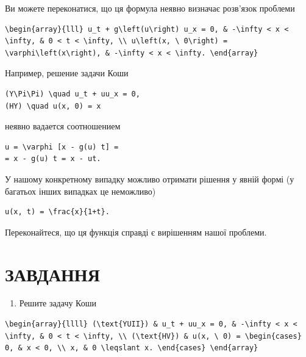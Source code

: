 \documentclass[
  ukrainian,
]{article}
\providecommand{\tightlist}{%
  \setlength{\itemsep}{0pt}\setlength{\parskip}{0pt}}
\begin{document}
Ви можете переконатися, що ця формула неявно визначає розв'язок проблеми

\begin{verbatim}
\begin{array}{lll} u_t + g\left(u\right) u_x = 0, & -\infty < x < \infty, & 0 < t < \infty, \\ u\left(x, \ 0\right) = \varphi\left(x\right), & -\infty < x < \infty. \end{array}
\end{verbatim}

Например, решение задачи Коши

\begin{verbatim}
(Y\Pi\Pi) \quad u_t + uu_x = 0,
(HY) \quad u(x, 0) = x
\end{verbatim}

неявно вадается соотношением

\begin{verbatim}
u = \varphi [x - g(u) t] =
= x - g(u) t = x - ut.
\end{verbatim}

У нашому конкретному випадку можливо отримати рішення у явній формі (у
багатьох інших випадках це неможливо)

\begin{verbatim}
u(x, t) = \frac{x}{1+t}.
\end{verbatim}

Переконайтеся, що ця функція справді є вирішенням нашої проблеми.

\section{\texorpdfstring{\textbf{ЗАВДАННЯ}}{ЗАВДАННЯ}}\label{ux437ux430ux432ux434ux430ux43dux43dux44f}

\begin{enumerate}
\def\labelenumi{\arabic{enumi}.}
\tightlist
\item
  Решите задачу Коши
\end{enumerate}

\begin{verbatim}
\begin{array}{llll} (\text{YUII}) & u_t + uu_x = 0, & -\infty < x < \infty, & 0 < t < \infty, \\ (\text{HV}) & u(x, \ 0) = \begin{cases} 0, & x < 0, \\ x, & 0 \leqslant x. \end{cases} \end{array}
\end{verbatim}
\end{document}

